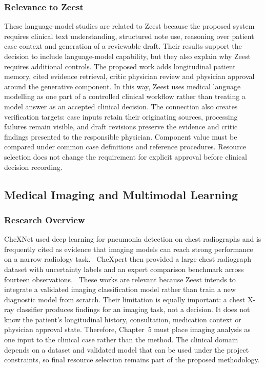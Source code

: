 \subsubsection{Relevance to Zeest}

These language-model studies are related to Zeest because the proposed system requires clinical text understanding, structured note use, reasoning over patient case context and generation of a reviewable draft. Their results support the decision to include language-model capability, but they also explain why Zeest requires additional controls. The proposed work adds longitudinal patient memory, cited evidence retrieval, critic physician review and physician approval around the generative component. In this way, Zeest uses medical language modelling as one part of a controlled clinical workflow rather than treating a model answer as an accepted clinical decision. The connection also creates verification targets: case inputs retain their originating sources, processing failures remain visible, and draft revisions preserve the evidence and critic findings presented to the responsible physician. Component value must be compared under common case definitions and reference procedures. Resource selection does not change the requirement for explicit approval before clinical decision recording.

\subsection{Medical Imaging and Multimodal Learning}
\subsubsection{Research Overview}

CheXNet used deep learning for pneumonia detection on chest radiographs and is frequently cited as evidence that imaging models can reach strong performance on a narrow radiology task.~\cite{zeestB:chexnet} CheXpert then provided a large chest radiograph dataset with uncertainty labels and an expert comparison benchmark across fourteen observations.~\cite{zeestB:chexpert} These works are relevant because Zeest intends to integrate a validated imaging classification model rather than train a new diagnostic model from scratch. Their limitation is equally important: a chest X-ray classifier produces findings for an imaging task, not a decision. It does not know the patient's longitudinal history, consultation, medication context or physician approval state. Therefore, Chapter~5 must place imaging analysis as one input to the clinical case rather than the method. The clinical domain depends on a dataset and validated model that can be used under the project constraints, so final resource selection remains part of the proposed methodology.

